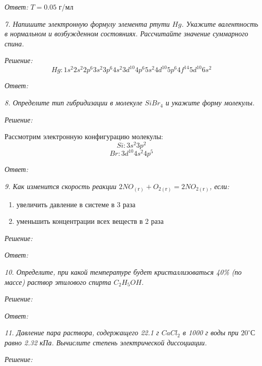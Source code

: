 \emph{Ответ: } \( T = 0.05 \) г/мл

\pagebreak

\emph{7. Напишите электронную формулу элемента ртути \( Hg \). Укажите 
валентность в нормальном и возбужденном состояниях. Рассчитайте значение 
суммарного спина.}

\emph{Решение:}
\[
	Hg: 1s^2 2s^2 2p^6 3s^2 3p^6 4s^2 3d^{10} 4p^6 5s^2 4d^{10} 5p^6
        4f^{14} 5d^{10} 6s^2
\]

\emph{Ответ: }

\pagebreak

\emph{8. Определите тип гибридизации в молекуле \( SiBr_4 \) и укажите 
форму молекулы.}

\emph{Решение:}

Рассмотрим электронную конфигурацию молекулы:
\[ Si: 3s^2 3p^2 \]
\[ Br: 3d^10 4s^2 4p^5 \]

\emph{Ответ: }

\pagebreak

\emph{9. Как изменится скорость реакции 
\( 2NO_{(\text{г})} + O_{2(\text{г})} = 2NO_{2(\text{г})} \), если:}
\begin{enumerate}
    \item увеличить давление в системе в 3 раза
    \item уменьшить концентрации всех веществ в 2 раза
\end{enumerate}

\emph{Решение:}

\emph{Ответ: }

\pagebreak

\emph{10. Определите, при какой температуре будет кристаллизоваться 40\% 
(по массе) раствор этилового спирта \( C_2H_5OH \).}

\emph{Решение:}

\emph{Ответ: }

\pagebreak

\emph{11. Давление пара раствора, содержащего 22.1 г \( CaCl_2 \) в 
1000 г воды при \( 20 ^{\circ}С \) равно 2.32 кПа. Вычислите степень 
электрической диссоциации.}

\emph{Решение:}

